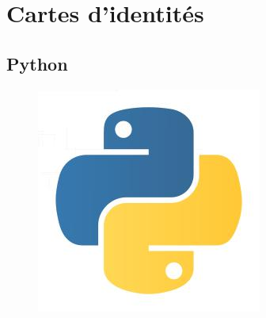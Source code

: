 \section{Cartes d'identités}

\subsection{Python}

\begin{figure}[!ht]
	\center
	\includegraphics[scale=0.4]{img/python.jpeg}
\end{figure}

